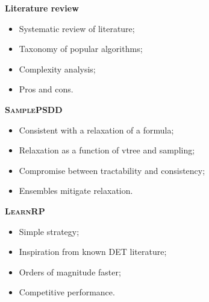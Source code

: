 \documentclass[14pt]{ffslides}
\begin{document}
\begin{minipage}{0.35\textwidth}
  \vspace{1.5cm}
  \large
  {\Large\textbf{Literature review}}
  \begin{itemize}
    \item Systematic review of literature;
    \item Taxonomy of popular algorithms;
    \item Complexity analysis;
    \item Pros and cons.
  \end{itemize}
  \vskip 0.5cm

  \color{boxgray!40}
  {\Large\textbf{\textsc{SamplePSDD}}}
  \begin{itemize}
    \item Consistent with a relaxation of a formula;
    \item Relaxation as a function of vtree and sampling;
    \item Compromise between tractability and consistency;
    \item Ensembles mitigate relaxation.
  \end{itemize}
  \vskip 0.5cm

  {\Large\textbf{\textsc{LearnRP}}}
  \begin{itemize}
    \item Simple strategy;
    \item Inspiration from known DET literature;
    \item Orders of magnitude faster;
    \item Competitive performance.
  \end{itemize}
\end{minipage}
\end{document}
